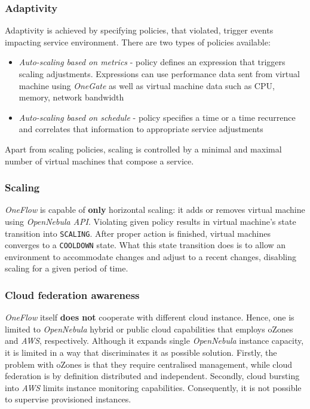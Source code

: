 \subsubsection{Adaptivity}
Adaptivity is achieved by specifying policies, that violated, trigger events impacting service environment. There are two types of policies available:
\begin{itemize}
 \item \emph{Auto-scaling based on metrics} - policy defines an expression that triggers scaling adjustments. Expressions can use performance data sent from virtual machine using \emph{OneGate} as well as virtual machine data such as CPU, memory, network bandwidth
 \item \emph{Auto-scaling based on schedule} - policy specifies a time or a time recurrence and correlates that information to appropriate service adjustments
\end{itemize}

Apart from scaling policies, scaling is controlled by a minimal and maximal number of virtual machines that compose a service.

\subsubsection{Scaling}
\emph{OneFlow} is capable of \textbf{only} horizontal scaling: it adds or removes virtual machine using \emph{OpenNebula API}. Violating given policy results in virtual machine's state transition into \texttt{SCALING}. After proper action is finished, virtual machines converges to a \texttt{COOLDOWN} state. What this state transition does is to allow an environment to accommodate changes and adjust to a recent changes, disabling scaling for a given period of time.


\subsubsection{Cloud federation awareness}
\emph{OneFlow} itself \textbf{does not} cooperate with different cloud instance. Hence, one is limited to \emph{OpenNebula} hybrid or public cloud capabilities that employs oZones and \emph{AWS}, respectively. Although it expands single \emph{OpenNebula} instance capacity, it is limited in a way that discriminates it as possible solution. Firstly, the problem with oZones is that they require centralised management, while cloud federation is by definition distributed and independent. Secondly, cloud bursting into \emph{AWS} limits instance monitoring capabilities. Consequently, it is not possible to supervise provisioned instances.

